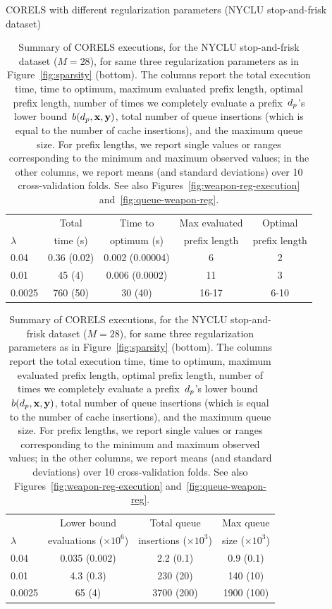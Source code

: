 \begin{table}[t!]
\begin{centering}
CORELS with different regularization parameters (NYCLU stop-and-frisk dataset) \\
\end{centering}
\vspace{2mm}
\begin{tabular}{l | c | c | c | c}
& Total & Time to & Max evaluated & Optimal \\
$\lambda$ & time (s) & optimum (s) & prefix length & prefix length \\
\hline
0.04 & 0.36 (0.02) & 0.002 (0.00004) & 6 & 2 \\
0.01 & 45 (4) & 0.006 (0.0002) & 11 & 3 \\
0.0025 & 760 (50) & 30 (40) & 16-17 & 6-10 \\
\hline
\end{tabular}
\begin{tabular}{l | c | c | c}
\hline
& Lower bound & Total queue &  Max queue \\
$\lambda$ & evaluations ($\times 10^6$) & insertions ($\times 10^3$) & size ($\times 10^3$) \\
\hline
0.04 & 0.035 (0.002) & 2.2 (0.1) & 0.9 (0.1) \\
0.01 & 4.3 (0.3) & 230 (20) & 140 (10) \\
0.0025 & 65 (4) & 3700 (200) & 1900 (100) \\
\end{tabular}
\caption{Summary of CORELS executions, for the NYCLU stop-and-frisk dataset (${M = 28}$),
for same three regularization parameters as in Figure~\ref{fig:sparsity} (bottom).
%
The columns report the total execution time,
time to optimum, maximum evaluated prefix length, optimal prefix length,
number of times we completely evaluate a prefix~$d_p$'s lower bound~$b(d_p, \mathbf{x}, \mathbf{y})$,
total number of queue insertions (which is equal to the number of cache insertions),
and the maximum queue size.
%
For prefix lengths, we report single values or ranges corresponding to the minimum and maximum observed values;
in the other columns, we report means (and standard deviations) over 10 cross-validation folds.
%
See also Figures~\ref{fig:weapon-reg-execution} and~\ref{fig:queue-weapon-reg}.
}
\vspace{4mm}
\label{tab:weapon-reg}
\end{table}

